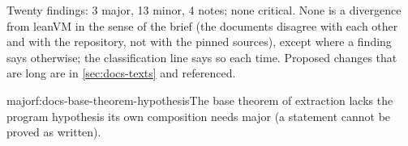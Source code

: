 \label{sec:docs-findings}

Twenty findings: 3 major, 13 minor, 4 notes; none critical. None is a divergence from leanVM in the sense of the brief (the documents disagree with each other and with the repository, not with the pinned sources), except where a finding says otherwise; the classification line says so each time. Proposed changes that are long are in \cref{sec:docs-texts} and referenced.

\begin{finding}{major}{f:docs-base-theorem-hypothesis}{The base theorem of extraction lacks the program hypothesis its own composition needs}
 major (a statement cannot be proved as written).
 \begin{sloppypar}

\end{sloppypar}
\end{finding}
